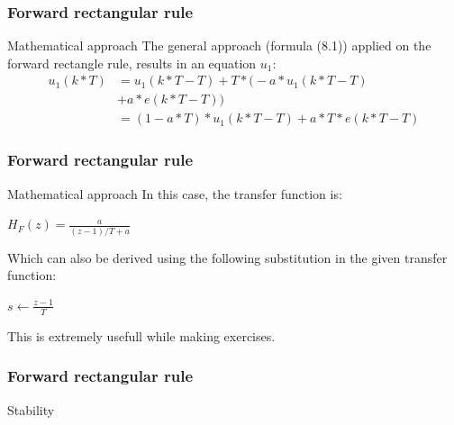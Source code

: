 \begin{frame}
	\frametitle{Forward rectangular rule}
	\begin{block}{Mathematical approach}
		The general approach (formula (8.1)) applied on the forward rectangle rule, results in an equation $u_1$:
		\begin{align*}
		u_1(k*T)& =u_1(k*T - T) + T*\big(-a*u_1(k*T - T)\\
		& + a*e(k*T - T) \big)\\
		& =(1 - a*T)*u_1(k*T - T) + a*T*e(k*T - T)
		\end{align*}
	\end{block}
\end{frame}

\begin{frame}
	\frametitle{Forward rectangular rule}
	\begin{block}{Mathematical approach}
		In this case, the transfer function is:
		\begin{center}
		$H_F(z) = \frac{a}{(z-1)/T+a}$
		\end{center}
		Which can also be derived using the following substitution in the given transfer function:
		\begin{center}
			$s \gets \frac{z-1}{T}$
		\end{center}
		This is extremely usefull while making exercises.
	\end{block}
\end{frame}
	
\begin{frame}
	\frametitle{Forward rectangular rule}
	\begin{block}{Stability}
	\end{block}
\end{frame}	

